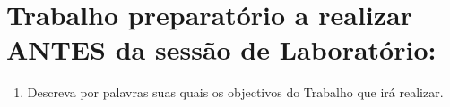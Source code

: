 \documentclass[a4paper,12pt]{article}  %
\begin{document}
\section{\sf Trabalho preparatório a realizar  ANTES da sessão de Laboratório:}
\begin{enumerate}
\item Descreva por palavras suas quais os objectivos do Trabalho que irá realizar.

\end{enumerate}

\noindent\underline{\makebox[\textwidth][r]{~}} \\
\noindent\underline{\makebox[\textwidth][r]{~}} \\
\noindent\underline{\makebox[\textwidth][r]{~}} \\
\noindent\underline{\makebox[\textwidth][r]{~}} \\
\noindent\underline{\makebox[\textwidth][r]{~}} \\
\noindent\underline{\makebox[\textwidth][r]{~}} \\
\noindent\underline{\makebox[\textwidth][r]{~}} \\

\end{document}
